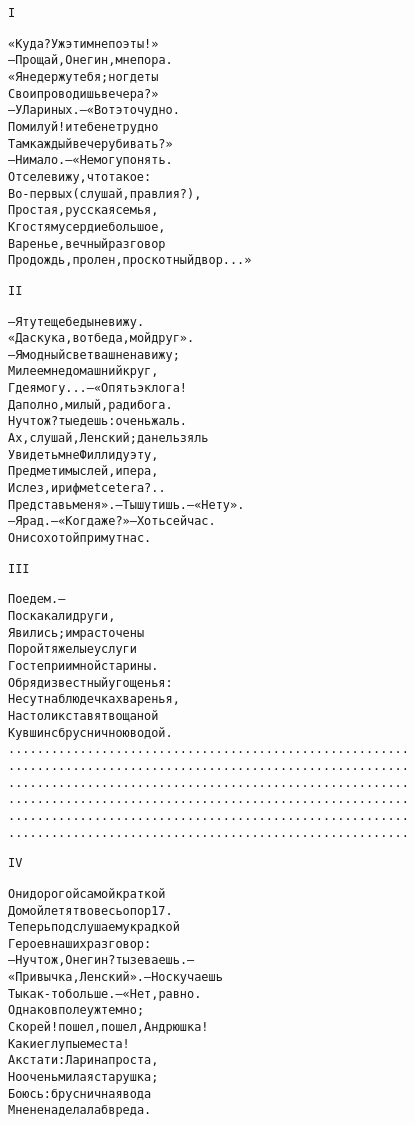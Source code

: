 \begin{minipage}[t]{\dimexpr 0.5\textwidth -\tabcolsep-.5pt}
\begin{alltt}\normalfont\centering
I

«Куда? Уж эти мне поэты!»
— Прощай, Онегин, мне пора.
«Я не держу тебя; но где ты
Свои проводишь вечера?»
— У Лариных. — «Вот это чудно.
Помилуй! и тебе не трудно
Там каждый вечер убивать?»
— Нимало. — «Не могу понять.
Отселе вижу, что такое:
Во-первых (слушай, прав ли я?),
Простая, русская семья,
К гостям усердие большое,
Варенье, вечный разговор
Про дождь, про лен, про скотный двор...»
\end{alltt}
\end{minipage}

\begin{minipage}[t]{\dimexpr 0.5\textwidth -\tabcolsep-.5pt}
\begin{alltt}\normalfont\centering
II

— Я тут еще беды не вижу.
«Да скука, вот беда, мой друг».
— Я модный свет ваш ненавижу;
Милее мне домашний круг,
Где я могу... — «Опять эклога!
Да полно, милый, ради бога.
Ну что ж? ты едешь: очень жаль.
Ах, слушай, Ленский; да нельзя ль
Увидеть мне Филлиду эту,
Предмет и мыслей, и пера,
И слез, и рифм et cetera?..
Представь меня». — Ты шутишь. — «Нету».
— Я рад. — «Когда же?» — Хоть сейчас.
Они с охотой примут нас.
\end{alltt}
\end{minipage}
\clearpage

\begin{minipage}[t]{\dimexpr 0.5\textwidth -\tabcolsep-.5pt}
\begin{alltt}\normalfont\centering
III

Поедем. —
                Поскакали други,
Явились; им расточены
Порой тяжелые услуги
Гостеприимной старины.
Обряд известный угощенья:
Несут на блюдечках варенья,
На столик ставят вощаной
Кувшин с брусничною водой.
 ........................................................
 ........................................................
 ........................................................
 ........................................................
 ........................................................
 ........................................................
\end{alltt}
\end{minipage}

\begin{minipage}[t]{\dimexpr 0.5\textwidth -\tabcolsep-.5pt}
\begin{alltt}\normalfont\centering
IV

Они дорогой самой краткой
Домой летят во весь опор 17.
Теперь подслушаем украдкой
Героев наших разговор:
— Ну что ж, Онегин? ты зеваешь. —
«Привычка, Ленский». — Но скучаешь
Ты как-то больше. — «Нет, равно.
Однако в поле уж темно;
Скорей! пошел, пошел, Андрюшка!
Какие глупые места!
А кстати: Ларина проста,
Но очень милая старушка;
Боюсь: брусничная вода
Мне не наделала б вреда.
\end{alltt}
\end{minipage}
\clearpage

